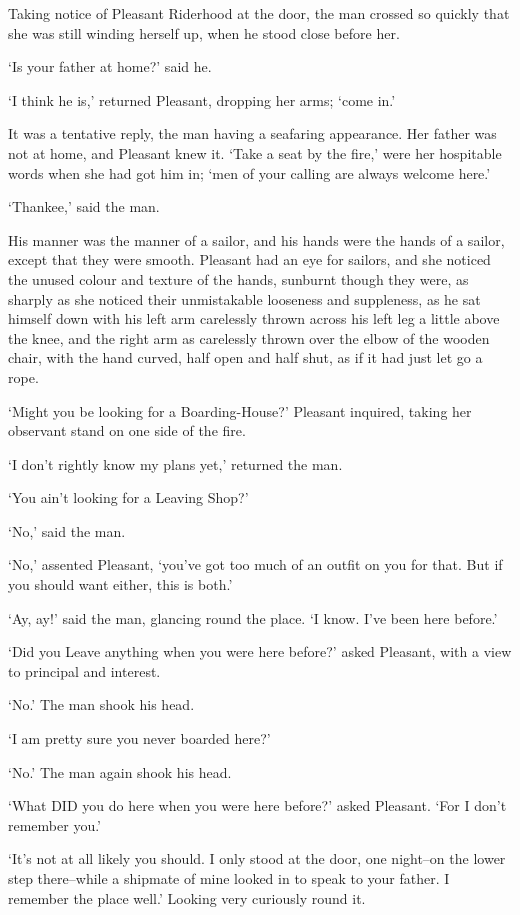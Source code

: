 Taking notice of Pleasant Riderhood at the door, the man crossed so
quickly that she was still winding herself up, when he stood close
before her.

‘Is your father at home?’ said he.

‘I think he is,’ returned Pleasant, dropping her arms; ‘come in.’

It was a tentative reply, the man having a seafaring appearance. Her
father was not at home, and Pleasant knew it. ‘Take a seat by the fire,’
were her hospitable words when she had got him in; ‘men of your calling
are always welcome here.’

‘Thankee,’ said the man.

His manner was the manner of a sailor, and his hands were the hands of
a sailor, except that they were smooth. Pleasant had an eye for sailors,
and she noticed the unused colour and texture of the hands, sunburnt
though they were, as sharply as she noticed their unmistakable looseness
and suppleness, as he sat himself down with his left arm carelessly
thrown across his left leg a little above the knee, and the right arm
as carelessly thrown over the elbow of the wooden chair, with the hand
curved, half open and half shut, as if it had just let go a rope.

‘Might you be looking for a Boarding-House?’ Pleasant inquired, taking
her observant stand on one side of the fire.

‘I don’t rightly know my plans yet,’ returned the man.

‘You ain’t looking for a Leaving Shop?’

‘No,’ said the man.

‘No,’ assented Pleasant, ‘you’ve got too much of an outfit on you for
that. But if you should want either, this is both.’

‘Ay, ay!’ said the man, glancing round the place. ‘I know. I’ve been
here before.’

‘Did you Leave anything when you were here before?’ asked Pleasant, with
a view to principal and interest.

‘No.’ The man shook his head.

‘I am pretty sure you never boarded here?’

‘No.’ The man again shook his head.

‘What DID you do here when you were here before?’ asked Pleasant. ‘For I
don’t remember you.’

‘It’s not at all likely you should. I only stood at the door, one
night--on the lower step there--while a shipmate of mine looked in to
speak to your father. I remember the place well.’ Looking very curiously
round it.

